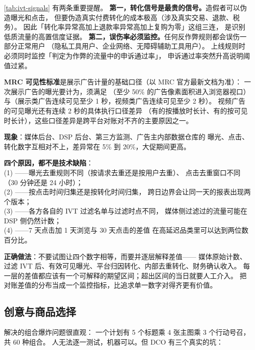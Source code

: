 \cref{tab:ivt-signals} 有两条重要提醒。
\textbf{第一，转化信号是最贵的信号。}造假者可以伪造曝光和点击，
但要伪造真实付费转化的成本极高（涉及真实交易、退款、税务）。
因此「转化率异常高加上退款率异常高加上复购为零」这组三连，
是识别低质流量的高置信度证据。
\textbf{第二，误伤率必须监控。}任何反作弊规则都会误伤一部分正常用户
（隐私工具用户、企业网络、无障碍辅助工具用户）。
上线规则时必须同时监控「判定为作弊的流量中的申诉通过率」，
申诉通过率突然升高说明阈值过紧。

\textbf{MRC 可见性标准}是展示广告计量的基础口径（以 MRC 官方最新文档为准）：
一次展示广告的曝光要计为，须满足
（至少 50\% 的广告像素面积进入浏览器视口）
与（展示类广告连续可见至少 1 秒，视频类广告连续可见至少 2 秒）。
视频广告的可见曝光还有连续 2 秒的具体执行口径差异
（有的按播放时长计、有的按可见时长计），这些口径差异是跨平台对账对不齐的主要原因之一。

\begin{pitfall}
\textbf{现象}：媒体后台、DSP 后台、第三方监测、广告主内部数据仓库的
曝光、点击、转化数字互相对不上，差异常在 5\% 到 20\%，大促期间更高。

\textbf{四个原因，都不是技术缺陷}：\\
(1) ——曝光去重规则不同（按请求去重还是按用户去重）、
点击去重窗口不同（30 分钟还是 24 小时）；\\
(2) ——按点击时间归集还是按转化时间归集，
跨日边界会让同一天的报表出现两个版本；\\
(3) ——各方各自的 IVT 过滤名单与过滤时点不同，
媒体侧过滤过的流量可能在 DSP 侧仍然计数；\\
(4) ——7 天点击加 1 天浏览与 30 天点击的差值
在高延迟品类里可以达到两位数百分比。

\textbf{正确做法}：不要试图让四个数字相等，而要并逐层解释差值——
媒体原始计数、过滤 IVT 后、有效可见曝光、平台归因转化、内部去重转化、财务确认收入。
每一层的差值都应该有一个可解释的期望区间；超出区间的当日就要人工介入。
把对账差值的分布当成一个监控指标，比追求单一数字对得齐更有价值。
\end{pitfall}

\subsection{创意与商品选择}

 解决的组合爆炸问题很直观：
一个计划有 5 个标题乘 4 张主图乘 3 个行动号召，共 60 种组合。
人无法逐一测试，机器可以。但 DCO 有三个真实的坑：

